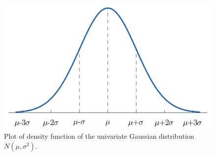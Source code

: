 \documentclass[11pt]{article}
\begin{document}
\begin{figure}[h!]
\centering
\includegraphics[scale=0.3]{unigaussian}
\caption{Plot of density function of the univariate Gaussian distribution $N(\mu,\sigma^2)$.}
\label{fig:gaussian1}
\end{figure}
\end{document}
